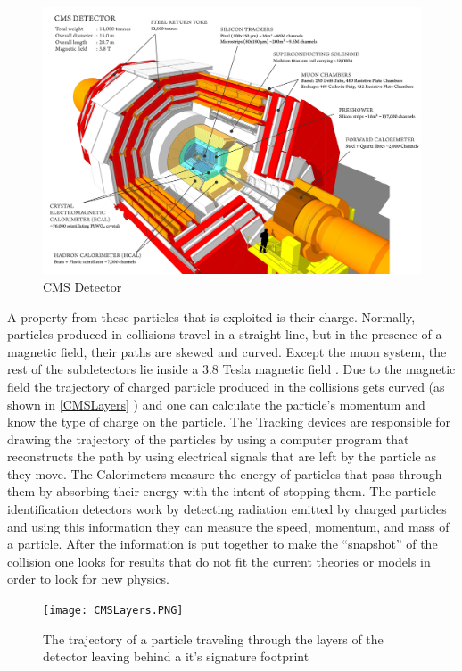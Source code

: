 \begin{figure}
\includegraphics[width=\linewidth]{CMSLayout.png}
\caption{CMS Detector \label{CMSLayout}}
\end{figure}

A property from these particles that is exploited is their charge. Normally, particles produced in collisions travel in a straight line, but in the presence of a magnetic field, their paths are skewed and curved. Except the muon system, the rest of the subdetectors lie inside a 3.8 Tesla magnetic field . Due to the magnetic field the trajectory of charged particle produced in the collisions gets curved  (as shown in \autoref{CMSLayers} ) and one can calculate the particle’s momentum and know the type of charge on the particle.  The Tracking devices are responsible for drawing the trajectory of the particles by using a computer program that reconstructs the path by using electrical signals that are left by the particle as they move.  The Calorimeters measure the energy of particles that pass through them by absorbing their energy with the intent of stopping them. The particle identification detectors work by detecting radiation emitted by charged particles and using this information they can measure the speed, momentum, and mass of a particle. After the information is put together to make the “snapshot” of the collision one looks for results that do not fit the current theories or models in order to look for new physics.

\begin{figure}[h]
\texttt{[image: CMSLayers.PNG]}
\caption{The trajectory of a particle traveling through the layers of the detector leaving behind a it's signature footprint\label{CMSLayers}}
\end{figure}


